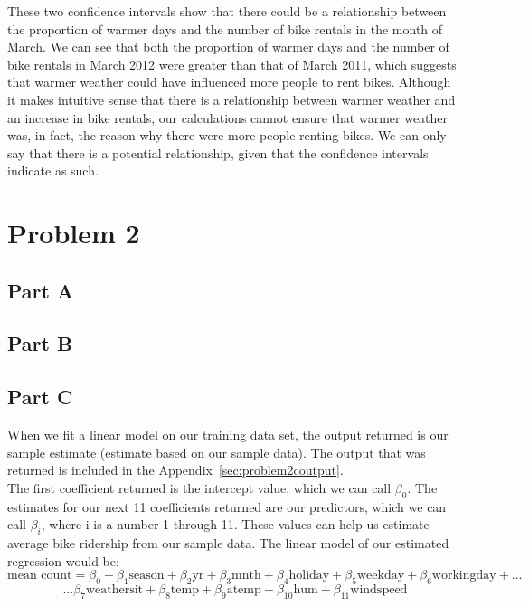 \documentclass[11pt]{article}
\begin{document}
These two confidence intervals show that there could be a relationship between the proportion of warmer days and the number of bike rentals in the month of March. We can see that both the proportion of warmer days and the number of bike rentals in March 2012 were greater than that of March 2011, which suggests that warmer weather could have influenced more people to rent bikes. Although it makes intuitive sense that there is a relationship between warmer weather and an increase in bike rentals, our calculations cannot ensure that warmer weather was, in fact, the reason why there were more people renting bikes. We can only say that there is a potential relationship, given that the confidence intervals indicate as such. 
\pagebreak



\section{Problem 2}
\label{sec:problem2}
\subsection{Part A}
\label{subsec:2a}
\subsection{Part B}
\label{subsec:2b}
\subsection{Part C}
\label{subsec:2c}

When we fit a linear model on our training data set, the output returned is our sample estimate (estimate based on our sample data). The output that was returned is included in the Appendix~\ref{sec:problem2coutput}.
\\

The first coefficient returned is the intercept value, which we can call $\beta_{0}$. The estimates for our next 11 coefficients returned are our predictors, which we can call  $\beta_{i}$, where i is a number 1 through 11. These values can help us estimate average bike ridership from our sample data. The linear model of our estimated regression would be:
\begin{equation}
\text{mean count} = \beta_0 + \beta_1 \text{season} + \beta_2 \text{yr} + \beta_3\text{mnth} + \beta_4\text{holiday} + \beta_5\text{weekday} + \beta_6\text{workingday} +  \dots
\end{equation}
\begin{equation}
\dots \beta_7 \text{weathersit} + \beta_8 \text{temp} + \beta_9 \text{atemp} + \beta_{10} \text{hum} + \beta_{11} \text{windspeed}
\end{equation}
\end{document}
